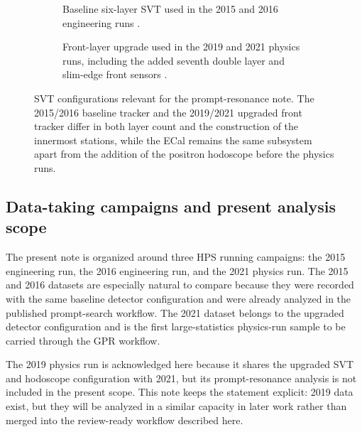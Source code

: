 \begin{figure}[H]
\centering
\begin{subfigure}[t]{0.90\linewidth}
  \centering
  \caption{Baseline six-layer SVT used in the 2015 and 2016 engineering runs
  \cite{HPS2016BumpInternal}.}
\end{subfigure}

\vspace{0.9em}

\begin{subfigure}[t]{0.78\linewidth}
  \centering
  \caption{Front-layer upgrade used in the 2019 and 2021 physics runs, including the
  added seventh double layer and slim-edge front sensors
  \cite{HPSExperiment2022,HPSSlimEdgeSensors2020}.}
\end{subfigure}
\caption{SVT configurations relevant for the prompt-resonance note. The 2015/2016
baseline tracker and the 2019/2021 upgraded front tracker differ in both layer count
and the construction of the innermost stations, while the ECal remains the same
subsystem apart from the addition of the positron hodoscope before the physics runs.}
\label{fig:hps-svt-eras}
\end{figure}

\subsection{Data-taking campaigns and present analysis scope}

The present note is organized around three HPS running campaigns: the 2015 engineering
run, the 2016 engineering run, and the 2021 physics run. The 2015 and 2016 datasets
are especially natural to compare because they were recorded with the same baseline
detector configuration and were already analyzed in the published prompt-search
workflow. The 2021 dataset belongs to the upgraded detector configuration and is the
first large-statistics physics-run sample to be carried through the GPR workflow.

The 2019 physics run is acknowledged here because it shares the upgraded SVT and
hodoscope configuration with 2021, but its prompt-resonance analysis is not included in
the present scope. This note keeps the statement explicit: 2019 data exist, but they
will be analyzed in a similar capacity in later work rather than merged into the
review-ready workflow described here.


